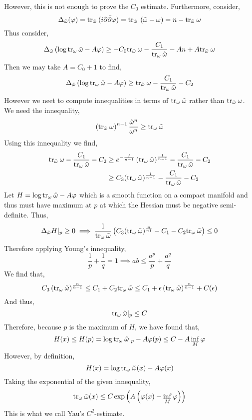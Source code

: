 \documentclass[12pt]{extarticle}
\theoremstyle{definition}
\begin{document}
However, this is not enough to prove the $C_0$ estimate. Furthermore, consider,
\[ \Delta_{\tilde{\omega}} (\varphi) = \mathrm{tr}_{\tilde{\omega}} \:( i \partial \bar{\partial} \varphi) = \mathrm{tr}_{\tilde{\omega}} \: \left( \tilde{\omega} - \omega \right) = n - \mathrm{tr}_{\tilde{\omega}} \: \omega \] 
Thus consider,
\begin{align*}
\Delta_{\tilde{\omega}} \left( \log{\mathrm{tr}_{\omega} \: \tilde{\omega}} - A \varphi \right) \ge - C_0 \mathrm{tr}_{\tilde{\omega}} \: \omega - \frac{C_1}{\mathrm{tr}_{\omega} \: \tilde{\omega}} - A n + A \mathrm{tr}_{\tilde{\omega}} \: \omega
\end{align*}
Then we may take $A = C_0 + 1$ to find,
\begin{align*}
\Delta_{\tilde{\omega}} \left( \log{\mathrm{tr}_{\omega} \: \tilde{\omega}} - A \varphi \right) \ge \mathrm{tr}_{\tilde{\omega}} \: \omega - \frac{C_1}{\mathrm{tr}_{\omega} \: \tilde{\omega}} - C_2
\end{align*}
However we neet to compute innequalities in terms of $\mathrm{tr}_{\omega} \:{\tilde{\omega}}$ rather than $\mathrm{tr}_{\tilde{\omega}} \:{\omega}$. We need the innequality,
\[ \left( \mathrm{tr}_{\tilde{\omega}} \: \omega \right)^{n-1} \frac{\tilde{\omega}^n}{\omega^n} \ge \mathrm{tr}_{\omega} \: \tilde{\omega} \]
Using this innequality we find,
\begin{align*}
\mathrm{tr}_{\tilde{\omega}} \: \omega - \frac{C_1}{\mathrm{tr}_{\omega} \: \tilde{\omega}} - C_2 
& \ge e^{- \frac{f}{n-1}} \left( \mathrm{tr}_{\omega} \:{\tilde{\omega}} \right)^{\frac{1}{n-1}} - \frac{C_1}{\mathrm{tr}_{\omega} \:{\tilde{\omega}}} - C_2
\\
& \ge C_3 (\mathrm{tr}_{\omega} \:{\tilde{\omega}} )^{\frac{1}{n-1}} - \frac{C_1}{\mathrm{tr}_{\omega} \: \tilde{\omega}} - C_2 
\end{align*}
Let $H = \log{\mathrm{tr}_{\omega} \:{\tilde{\omega}}} - A \varphi$ which is a smooth function on a compact manifold and thus must have maximum at $p$ at which the Hessian must be negative semi-definite. Thus,
\[ \Delta_{\tilde{\omega}} H|_p \ge 0 \implies \frac{1}{\mathrm{tr}_{\omega} \:{\tilde{\omega}}} \left( C_3 (\mathrm{tr}_{\omega} \:{\tilde{\omega}})^{\frac{n}{n1}} - C_1 - C_2 \mathrm{tr}_{\omega} \:{\tilde{\omega}} \right) \le 0 \]
Therefore applying Young's innequality,
\[ \frac{1}{p} + \frac{1}{q} = 1 \implies ab \le \frac{a^p}{p} + \frac{a^q}{q} \]
We find that,
\[ C_3 \left( \mathrm{tr}_{\omega} \:{\tilde{\omega}} \right)^{\frac{n}{n-1}} \le C_1 + C_2 \mathrm{tr}_{\omega} \: {\tilde{\omega}} \le C_1 + \epsilon \left( \mathrm{tr}_{\omega} \:{\tilde{\omega}} \right)^{\frac{n}{n-1}} + C(\epsilon) \]
And thus,
\[ \mathrm{tr}_{\omega} \:{\tilde{\omega}} |_p \le C \]
Therefore, because $p$ is the maximum of $H$, we have found that,
\[ H(x) \le H(p) = \log{\mathrm{tr}_{\omega} \:\tilde{\omega}|_p} - A \varphi(p) \le C - A \inf_M \varphi \]
However, by definition,
\[ H(x) = \log{\mathrm{tr}_{\omega} \:{\tilde{\omega}}}(x) - A \varphi(x) \]
Taking the exponential of the given innequality,
\[ \mathrm{tr}_{\omega} \:{\tilde{\omega}}(x) \le C \exp{\left(A \left( \varphi(x) - \inf\limits_M \varphi \right)\right)} \]
This is what we call Yau's $C^2$-estimate. 
\end{document}
